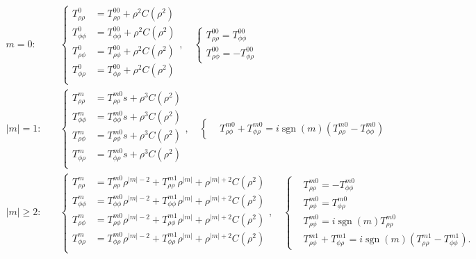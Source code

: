 \documentclass[a4paper, 11pt]{article}
\DeclareMathOperator{\sgn}{sgn}
\begin{document}
\begin{equation}
\begin{aligned}
    m = 0 :& \quad \left\{\begin{aligned}
        T_{\rho\rho}^0 &= T_{\rho\rho}^{00} + \rho^2 C(\rho^2) \\ 
        T_{\phi\phi}^0 &= T_{\phi\phi}^{00} + \rho^2 C(\rho^2) \\ 
        T_{\rho\phi}^0 &= T_{\rho\phi}^{00} + \rho^2 C(\rho^2) \\ 
        T_{\phi\rho}^0 &= T_{\phi\rho}^{00} + \rho^2 C(\rho^2) \\ 
    \end{aligned}\right.,\quad 
    \left\{\begin{aligned}
        T_{\rho\rho}^{00} = T_{\phi\phi}^{00} \\ 
        T_{\rho\phi}^{00} = -T_{\phi\rho}^{00}
    \end{aligned}\right. \\ 
    |m| = 1 :& \quad \left\{\begin{aligned}
        T_{\rho\rho}^m &= T_{\rho\rho}^{m0} s + \rho^3 C(\rho^2) \\
        T_{\phi\phi}^m &= T_{\phi\phi}^{m0} s + \rho^{3} C(\rho^2) \\
        T_{\rho\phi}^m &= T_{\rho\phi}^{m0} s + \rho^{3} C(\rho^2) \\
        T_{\phi\rho}^m &= T_{\phi\rho}^{m0} s + \rho^{3} C(\rho^2) \\
    \end{aligned}\right.,\quad \left\{\begin{aligned}
        &T_{\rho\phi}^{m0} + T_{\phi\rho}^{m0} = i\sgn(m) \left(T_{\rho\rho}^{m0} - T_{\phi\phi}^{m0}\right)
    \end{aligned}\right. \\
    |m| \geq 2 :& \quad \left\{\begin{aligned}
        T_{\rho\rho}^m &= T_{\rho\rho}^{m0} \rho^{|m|-2} + T_{\rho\rho}^{m1} \rho^{|m|} + \rho^{|m|+2} C(\rho^2) \\
        T_{\phi\phi}^m &= T_{\phi\phi}^{m0} \rho^{|m|-2} + T_{\phi \phi}^{m1} \rho^{|m|} + \rho^{|m|+2} C(\rho^2) \\
        T_{\rho\phi}^m &= T_{\rho\phi}^{m0} \rho^{|m|-2} + T_{\rho\phi}^{m1} \rho^{|m|} + \rho^{|m|+2} C(\rho^2) \\
        T_{\phi\rho}^m &= T_{\phi\rho}^{m0} \rho^{|m|-2} + T_{\phi\rho}^{m1} \rho^{|m|} + \rho^{|m|+2} C(\rho^2) \\
    \end{aligned}\right.,\quad \left\{\begin{aligned}
        &T_{\rho\rho}^{m0} = - T_{\phi\phi}^{m0}\\
        &T_{\rho\phi}^{m0} = T_{\phi\rho}^{m0} \\ 
        &T_{\rho\phi}^{m0} = i \sgn(m) T_{\rho\rho}^{m0} \\ 
        &T_{\rho\phi}^{m1} + T_{\phi\rho}^{m1} = i\sgn(m)\left(T_{\rho\rho}^{m1} - T_{\phi\phi}^{m1}\right).
    \end{aligned}\right.
\end{aligned}
\end{equation}
\end{document}
